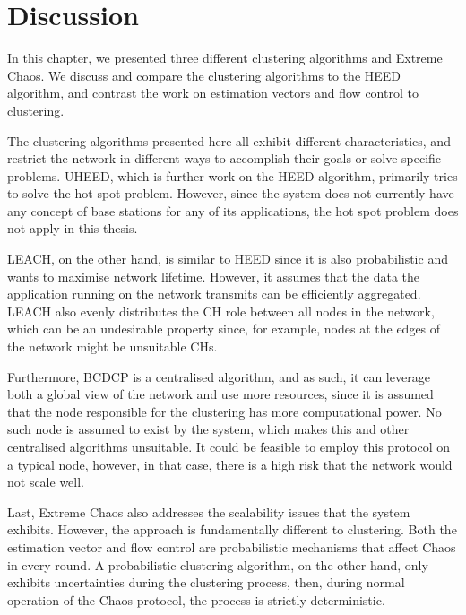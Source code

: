 \section{Discussion}
\begin{newtext}
In this chapter, we presented three different clustering algorithms and Extreme Chaos. We discuss and compare the clustering algorithms to the HEED algorithm, and contrast the work on estimation vectors and flow control to clustering. 


The clustering algorithms presented here all exhibit different characteristics, and restrict the network in different ways to accomplish their goals or solve specific problems. UHEED, which is further work on the HEED algorithm, primarily tries to solve the hot spot problem. However, since the \atwo{} system does not currently have any concept of base stations for any of its applications, the hot spot problem does not apply in this thesis.

LEACH, on the other hand, is similar to HEED since it is also probabilistic and wants to maximise network lifetime. However, it assumes that the data the application running on the network transmits can be efficiently aggregated. LEACH also evenly distributes the CH role between all nodes in the network, which can be an undesirable property since, for example, nodes at the edges of the network might be unsuitable CHs.


Furthermore, BCDCP is a centralised algorithm, and as such, it can leverage both a global view of the network and use more resources, since it is assumed that the node responsible for the clustering has more computational power. No such node is assumed to exist by the \atwo{} system, which makes this and other centralised algorithms unsuitable. It could be feasible to employ this protocol on a typical node, however, in that case, there is a high risk that the network would not scale well.

Last, Extreme Chaos also addresses the scalability issues that the \atwo{} system exhibits. However, the approach is fundamentally different to clustering. Both the estimation vector and flow control are probabilistic mechanisms that affect Chaos in every round. A probabilistic clustering algorithm, on the other hand, only exhibits uncertainties during the clustering process, then, during normal operation of the Chaos protocol, the process is strictly deterministic.
\end{newtext}